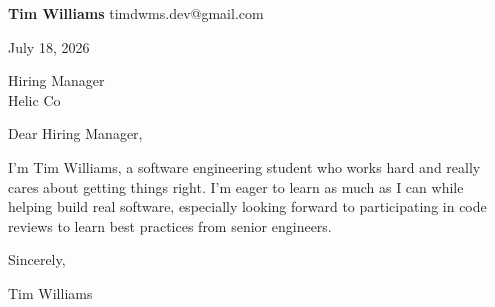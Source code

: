 \documentclass[12pt]{article}
\begin{document}
\textbf{Tim Williams} \hfill timdwms.dev@gmail.com

\vspace{1em}

July 18, 2026

\vspace{1em}

Hiring Manager \\
Helic   Co

\vspace{1em}

Dear Hiring Manager,

I'm Tim Williams, a software engineering student who works hard and really cares about getting things right. I'm eager to learn as much as I can while helping build real software, especially looking forward to participating in code reviews to learn best practices from senior engineers.

\vspace{1em}

Sincerely,

\vspace{2em}

Tim Williams
\end{document}
